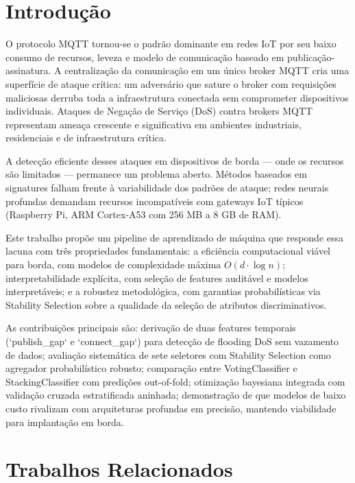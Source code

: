 \documentclass[12pt]{article}
\begin{document}
\section{Introdução}

O protocolo MQTT tornou-se o padrão dominante em redes IoT por seu baixo consumo de recursos, leveza e modelo de comunicação baseado em publicação-assinatura. A centralização da comunicação em um único broker MQTT cria uma superfície de ataque crítica: um adversário que sature o broker com requisições maliciosas derruba toda a infraestrutura conectada sem comprometer dispositivos individuais. Ataques de Negação de Serviço (DoS) contra brokers MQTT representam ameaça crescente e significativa em ambientes industriais, residenciais e de infraestrutura crítica.

A detecção eficiente desses ataques em dispositivos de borda — onde os recursos são limitados — permanece um problema aberto. Métodos baseados em signatures falham frente à variabilidade dos padrões de ataque; redes neurais profundas demandam recursos incompatíveis com gateways IoT típicos (Raspberry Pi, ARM Cortex-A53 com 256 MB a 8 GB de RAM).

Este trabalho propõe um pipeline de aprendizado de máquina que responde essa lacuna com três propriedades fundamentais: a  eficiência computacional viável para borda, com modelos de complexidade máxima $O(d \cdot \log n)$; interpretabilidade explícita, com seleção de features auditável e modelos interpretáveis; e a robustez metodológica, com garantias probabilísticas via Stability Selection sobre a qualidade da seleção de atributos discriminativos.

As contribuições principais são: derivação de duas features temporais (`publish\_gap` e `connect\_gap`) para detecção de flooding DoS sem vazamento de dados; avaliação sistemática de sete seletores com Stability Selection como agregador probabilístico robusto; comparação entre VotingClassifier e StackingClassifier com predições out-of-fold; otimização bayesiana integrada com validação cruzada estratificada aninhada; demonstração de que modelos de baixo custo rivalizam com arquiteturas profundas em precisão, mantendo viabilidade para implantação em borda.


\section{Trabalhos Relacionados}
\end{document}

